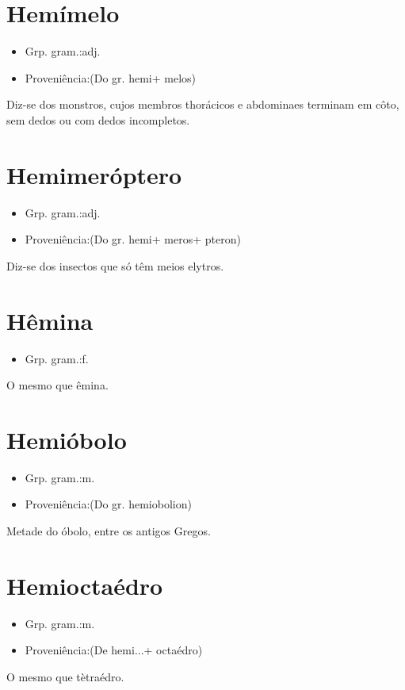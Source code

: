 \documentclass{article}
\begin{document}
\section{Hemímelo}
\begin{itemize}
\item {Grp. gram.:adj.}
\end{itemize}
\begin{itemize}
\item {Proveniência:(Do gr. \textunderscore hemi\textunderscore  + \textunderscore melos\textunderscore )}
\end{itemize}
Diz-se dos monstros, cujos membros thorácicos e abdominaes terminam em côto, sem dedos ou com dedos incompletos.
\section{Hemimeróptero}
\begin{itemize}
\item {Grp. gram.:adj.}
\end{itemize}
\begin{itemize}
\item {Proveniência:(Do gr. \textunderscore hemi\textunderscore  + \textunderscore meros\textunderscore  + \textunderscore pteron\textunderscore )}
\end{itemize}
Diz-se dos insectos que só têm meios elytros.
\section{Hêmina}
\begin{itemize}
\item {Grp. gram.:f.}
\end{itemize}
O mesmo que \textunderscore êmina\textunderscore .
\section{Hemióbolo}
\begin{itemize}
\item {Grp. gram.:m.}
\end{itemize}
\begin{itemize}
\item {Proveniência:(Do gr. \textunderscore hemiobolion\textunderscore )}
\end{itemize}
Metade do óbolo, entre os antigos Gregos.
\section{Hemioctaédro}
\begin{itemize}
\item {Grp. gram.:m.}
\end{itemize}
\begin{itemize}
\item {Proveniência:(De \textunderscore hemi...\textunderscore  + \textunderscore octaédro\textunderscore )}
\end{itemize}
O mesmo que \textunderscore tètraédro\textunderscore .
\end{document}
